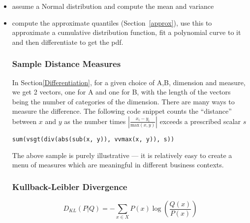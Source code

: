 \begin{itemize}
\subsubsection{Dealing with other measures}

The above example works when we are counting the number of occurrences.
That is what allows us to think about something like \(p_M|A\). This does not
translate in a straight-forward manner to the 
case where we are aggregating a measure like price. Say  we want to quantify
how the distribution of price for Males in Group A differs from the 
distribution of price for Males in Group B. 
We could use Section~\ref{KLDistance} if we had an estimate of the pdf of price for these two sets. To do so, we could either
\be
\item assume a Normal distribution and compute the mean and variance 
\item compute the approximate quantiles (Section~\ref{approx}), use this to 
approximate a cumulative distribution function, fit a polynomial curve to it and
then differentiate to get the pdf.
\ee

\subsubsection{Sample Distance Measures}

In Section\ref{Differentiation}, for a given choice of A,B, dimension and
measure, we get 2 vectors, one for A and one for B, with the length of the
vectors being the number of categories of the dimension. There are many ways to
measure the difference. The following code snippet counts the ``distance''
between \(x\) and \(y\) as the number times 
\(|\frac{x_i-y_i}{\mathrm{max}(x,y)}|\) exceeds a prescribed scalar \(s\)
\begin{verbatim}
sum(vsgt(div(abs(sub(x, y)), vvmax(x, y)), s))
\end{verbatim}
The above sample is purely illustrative --- it is relatively easy to create a
menu of measures which are meaningful in different business contexts.

\subsubsection{Kullback-Leibler Divergence}
\label{KLDistance}

\begin{displaymath}
D_{KL}(P | Q ) = - \sum_{x \in X} P(x) \log ( \frac{Q(x)}{P(x)})
\end{displaymath}


\end{itemize}
